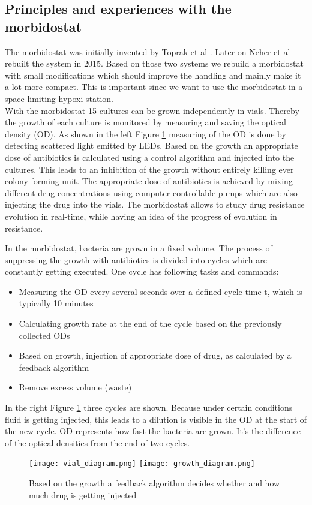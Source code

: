 \subsection{Principles and experiences with the morbidostat} 
The morbidostat was initially invented by Toprak et al \cite{morb_toprak}. Later on Neher et al \cite{doselmann_rapid_2017} rebuilt the system in 2015. Based on those two systems we rebuild a morbidostat with small modifications which should improve the handling and mainly make it a lot more compact. This is important since we want to use the morbidostat in a space limiting hypoxi-station. \\
With the morbidostat 15 cultures can be grown independently in vials. Thereby the growth of each culture is monitored by measuring and saving the optical density (OD). As shown in the left Figure \ref{figure:vial_setup} measuring of the OD is done by detecting scattered light emitted by LEDs. Based on the growth an appropriate dose of antibiotics is calculated using a control algorithm and injected into the cultures. This leads to an inhibition of the growth without entirely killing ever colony forming unit. The appropriate dose of antibiotics is achieved by mixing different drug concentrations using computer controllable pumps which are also injecting the drug into the vials.
The morbidostat allows to study drug resistance evolution in real-time, while having an idea of the progress of evolution in resistance.

In the morbidostat, bacteria are grown in a fixed volume. The process of suppressing the growth with antibiotics is divided into cycles which are constantly getting executed. One cycle has following tasks and commands:
\begin{itemize}
	\item Measuring the OD every several seconds over a defined cycle time \textDelta t, which is typically 10 minutes 
	\item Calculating growth rate at the end of the cycle based on the previously collected ODs
	\item Based on growth, injection of appropriate dose of drug, as calculated by a feedback algorithm
	\item Remove excess volume (waste)
\end{itemize}
In the right Figure \ref{figure:vial_setup} three cycles are shown. Because under certain conditions fluid is getting injected, this leads to a dilution is visible in the OD at the start of the new cycle. \textDelta OD represents how fast the bacteria are grown. It's the difference of the optical densities from the end of two cycles.  
\begin{figure}
	\texttt{[image: vial\_diagram.png]}
	\texttt{[image: growth\_diagram.png]}
	\caption{Based on the growth a feedback algorithm decides whether and how much drug is getting injected}
	\label{figure:vial_setup}
\end{figure}

